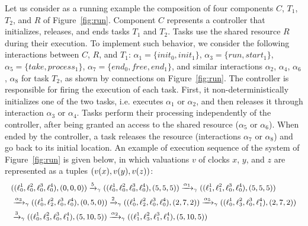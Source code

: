 
\begin{example}
  \label{exp:run}
  Let us consider as a running example the composition of four components $C$, $T_1$, $T_2$, and $R$ of Figure~\ref{fig:run}.
  Component $C$ represents a  controller that initializes, releases, and ends tasks $T_1$ and $T_2$.
  Tasks use the shared resource $R$ during their execution.
  To implement such behavior, we consider the following interactions between $C$, $R$, and $T_1$: $\alpha_1=\{init_0, init_1\}$,
    $\alpha_3=\{run, start_1\}$, $\alpha_5=\{ take, process_1\}$, $\alpha_7 = \{end_0, free, end_1 \}$, 
      and similar interactions $\alpha_2$, $\alpha_4$, $\alpha_6$, $\alpha_8$ for task $T_2$, 
      as shown by connections on Figure~\ref{fig:run}.
      The controller is responsible for firing
      the execution of each task. First, it non-deterministically initializes one
      of the two tasks, i.e. executes $\alpha_1$ or $\alpha_2$, and then
      releases it through interaction $\alpha_3$ or $\alpha_4$.
      Tasks perform their processing independently of the controller, after being granted an access to the shared resource ($\alpha_5$ or $\alpha_6$).
      When ended by the controller, a task releases the resource  (interactions $\alpha_7$ or $\alpha_8$) and go back to its initial location.
      An example of execution sequence of the system of Figure~\ref{fig:run} is given below, in which valuations $v$ of clocks $x$, $y$, and $z$ are represented as a tuples $(v(x),v(y),v(z))$:
      \begin{displaymath}
        \small{
        \begin{split}
          &((\ell_0^1,\ell_0^2,\ell_0^3,\ell_0^4),(0,0,0))\xrightarrow{5}_{\gamma}((\ell_0^1,\ell_0^2,\ell_0^3,\ell_0^4),(5,5,5))\xrightarrow{\alpha_1}_{\gamma}((\ell_1^1,\ell_1^2,\ell_0^3,\ell_0^4),(5,5,5))\\
          &\xrightarrow{\alpha_3}_{\gamma}((\ell_0^1,\ell_2^2,\ell_0^3,\ell_0^4),(0,5,0))\xrightarrow{2}_{\gamma}((\ell_0^1,\ell_2^2,\ell_0^3,\ell_0^4),(2,7,2))\xrightarrow{\alpha_5}_{\gamma}
          ((\ell_0^1,\ell_3^2,\ell_0^3,\ell_1^4),(2,7,2))\\&\xrightarrow{3}_{\gamma}((\ell_0^1,\ell_3^2,\ell_0^3,\ell_1^4),(5,10,5))\xrightarrow{\alpha_2}_{\gamma}((\ell_1^1,\ell_3^2,\ell_1^3,\ell_1^4),
          (5,10,5))
        \end{split}
      }
      \end{displaymath}
    
\end{example}
